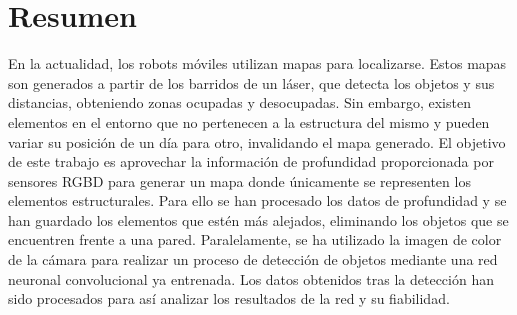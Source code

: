 

\usepackage[
backend=biber,
style=numeric,
sorting=none,
dateabbrev=false,
citestyle=numeric
]{biblatex}




\usepackage[font=footnotesize, skip=4pt, justification=centering]{caption}

\raggedbottom

\usepackage{array}

\newcommand{\comment}[1]{}

\usepackage{eurosym}



\usepackage{colortbl}




\pagestyle{fancy}

\maketitle

\chapter*{Resumen}
\setcounter{page}{5} %

En la actualidad, los robots móviles utilizan mapas para localizarse. Estos mapas son generados a partir de los barridos de un láser, que detecta los objetos y sus distancias, obteniendo zonas ocupadas y desocupadas. Sin embargo, existen elementos en el entorno que no pertenecen a la estructura del mismo y pueden variar su posición de un día para otro, invalidando el mapa generado. El objetivo de este trabajo es aprovechar la información de profundidad proporcionada por sensores RGBD para generar un mapa donde únicamente se representen los elementos estructurales. Para ello se han procesado los datos de profundidad y se han guardado los elementos que estén más alejados, eliminando los objetos que se encuentren frente a una pared. Paralelamente, se ha utilizado la imagen de color de la cámara para realizar un proceso de detección de objetos mediante una red neuronal convolucional ya entrenada. Los datos obtenidos tras la detección han sido procesados para así analizar los resultados de la red y su fiabilidad.\\

